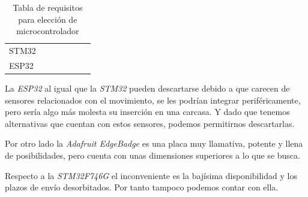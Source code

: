 \begin{table}[h]
\begin{tabular}{|l|c|c|c|ccc|}
        {\cellcolor[HTML]{CDDADE}STM32}                                                                & {\cellcolor[HTML]{CDDADE}{\color[HTML]{4CDE4C} \cmark}}            & {\cellcolor[HTML]{CDDADE}{\color[HTML]{9B9B9B} -}}                      & {\cellcolor[HTML]{CDDADE}{\color[HTML]{4CDE4C} \cmark}}                   & \multicolumn{1}{c|}{{\cellcolor[HTML]{CDDADE}{\color[HTML]{FD6864} \xmark}}} & \multicolumn{1}{c|}{{\cellcolor[HTML]{CDDADE}{\color[HTML]{4CDE4C} \cmark}}} & {\cellcolor[HTML]{CDDADE}{\color[HTML]{4CDE4C} \cmark}}                       \\
        {\cellcolor[HTML]{E8ECF1}ESP32}                                                                & {\cellcolor[HTML]{E8ECF1}{\color[HTML]{4CDE4C} \cmark}}            & {\cellcolor[HTML]{E8ECF1}{\color[HTML]{9B9B9B} -}}                      & {\cellcolor[HTML]{E8ECF1}{\color[HTML]{4CDE4C} \cmark}}                   & \multicolumn{1}{c|}{{\cellcolor[HTML]{E8ECF1}{\color[HTML]{FD6864} \xmark}}} & \multicolumn{1}{c|}{{\cellcolor[HTML]{E8ECF1}{\color[HTML]{4CDE4C} \cmark}}} & {\cellcolor[HTML]{E8ECF1}{\color[HTML]{4CDE4C} \cmark}}                       \\ \hline
    \end{tabular}
    \caption{Tabla de requisitos para elección de microcontrolador}
\end{table}

La \textit{ESP32} al igual que la \textit{STM32} pueden descartarse debido a que
carecen de sensores relacionados
con el movimiento, se les podrían integrar periféricamente, pero sería algo
más molesta su inserción en una carcasa. Y dado que tenemos alternativas que
cuentan con estos sensores, podemos permitirnos descartarlas.

Por otro lado la \textit{Adafruit EdgeBadge} es una placa muy llamativa,
potente y llena de posibilidades, pero cuenta con unas dimensiones superiores
a lo que se busca.

Respecto a la \textit{STM32F746G} el inconveniente es la bajísima disponibilidad
y los plazos de envío desorbitados. Por tanto tampoco podemos contar con ella.

